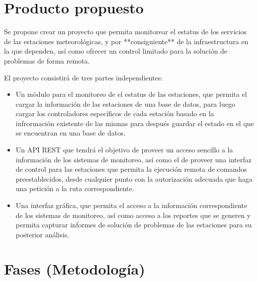 
\section{Producto propuesto}


Se propone crear un proyecto que permita monitorear el estatus de los servicios de las estaciones meteorológicas, y por **consiguiente** de la infraestructura en la que dependen, así como ofrecer un control limitado para la solución de problemas de forma remota.

El proyecto consistirá de tres partes independientes:

\begin{itemize}
   \item Un módulo para el monitoreo de el estatus de las estaciones, que permita el cargar la información de las estaciones de una base de datos, para luego cargar los controladores específicos de cada estación basado en la infrormación existente de las mismas para después guardar el estado en el que se encuentran en una base de datos.

   \item Un API REST que tendrá el objetivo de proveer un acceso sencillo a la información de los sistemas de monitoreo, así como el de proveer una interfaz de control para las estaciones que permita la ejecución remota de comandos preestablecidos, desde cualquier punto con la autorización adecuada que haga una petición a la ruta correspondiente.

   \item Una interfaz gráfica, que permita el acceso a la información correspondiente de los sistemas de monitoreo, así como acceso a los reportes que se generen y permita capturar informes de solución de problemas de las estaciones para su posterior análisis.

\end{itemize}

\section{Fases (Metodología)}


